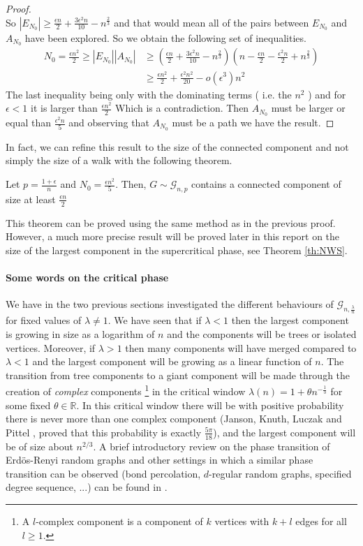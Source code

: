 \begin{proof}
\begin{equation}
	\end{equation}
	So $|E_{N_0}| \geq \frac{\epsilon n}{2} + \frac{3\epsilon^2n}{10} - n^{\frac{2}{3}}$ and that would mean all of the pairs between $E_{N_0}$ and $A_{N_0}$ have been explored.
	So we obtain the following set of inequalities.
	\begin{align}
		N_0 = \frac{\epsilon n^2}{2} \geq |E_{N_0}||A_{N_0}| &\geq (\frac{\epsilon n}{2} + \frac{3\epsilon^2n}{10} - n^{\frac{2}{3}} )
									(n - \frac{\epsilon n}{2} - \frac{\epsilon^2 n}{2} + n^{\frac{2}{3}})\\
									&\geq \frac{\epsilon n^2}{2} + \frac{\epsilon ^2 n^2 }{20} - o(\epsilon ^3)n^2 			
	\end{align}
	The last inequality being only with the dominating terms ( i.e. the $n^2$ ) and for $\epsilon < 1$ it is larger than $\frac{\epsilon n^2}{2}$ Which is a contradiction.
	Then $A_{N_0}$ must be larger or equal than $\frac{\epsilon ^2n}{5}$ and observing that $A_{N_0}$ must be a path we have the result.
\end{proof}
In fact, we can refine this result to the size of the connected component and not simply the size of a walk with the following theorem.
\begin{theorem}
	Let $p = \frac{1+\epsilon}{n}$ and $N_0 = \frac{\epsilon n^2}{5}$. Then, $G \sim \mathcal{G}_{n,p}$ contains a connected component of size at least $\frac{\epsilon n}{2}$
\end{theorem}
This theorem can be proved using the same method as in the previous proof.
However, a much more precise result will be proved later in this report on the size of the largest component in the supercritical phase, see Theorem \ref{th:NWS}.
\paragraph{Some words on the critical phase}
We have in the two previous sections investigated the different behaviours of $\mathcal{G}_{n, \frac{\lambda}{n}}$ for fixed values of $\lambda \neq 1$.
We have seen that if $\lambda < 1$ then the largest component is growing in size as a logarithm of $n$ and the components will be trees or isolated vertices.
Moreover, if $\lambda > 1$ then many components will have merged compared to $\lambda <1$ and the largest component will be growing as a linear function of $n$.
The transition from tree components to a giant component will be made through the creation of \emph{complex} components
\footnote{A $l$-complex component is a component of $k$ vertices with $k+l$ edges for all $l \geq 1$.}
in the critical window $\lambda(n) = 1 + \theta n^{-\frac{1}{3}}$ for some fixed $\theta \in \mathbb{R}$.
In this critical window there will be with positive probability there is never more than one complex component (Janson, Knuth, Luczak and Pittel \cite{JansonKnuth}, proved that this probability is exactly $\frac{5\pi}{18}$), and the largest component will be of size about $n^{2/3}$.
A brief introductory review on the phase transition of Erd\"os-Renyi random graphs and other settings in which a similar phase transition can be observed (bond percolation, $d$-regular random graphs, specified degree sequence, ...) can be found in \cite{Spencer09}.


